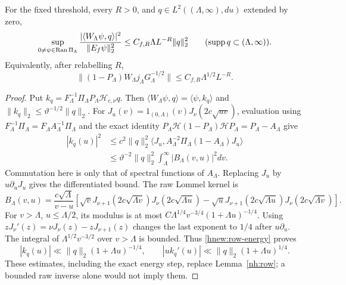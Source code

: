 \begin{proposition}
\label{hnew:natural-functional}
For the fixed threshold, every $R>0$, and
$q\in L^2((\Lambda,\infty),du)$ extended by zero,
\begin{equation}\label{hnew:exterior-functional}
 \sup_{0\ne\psi\in\operatorname{Ran}\Pi_\Lambda}
  \frac{|\langle W_\Lambda\psi,q\rangle|^2}{\|E_f\psi\|_2^2}
       \le C_{f,R}\Lambda L^{-R}\|q\|_2^2
       \qquad(\operatorname{supp} q\subset(\Lambda,\infty)).
\end{equation}
Equivalently, after relabelling $R$,
\[
 \|(1-P_\Lambda)W_\Lambda j_\Lambda G_\Lambda^{-1/2}\|
                       \le C_{f,R}\Lambda^{1/2}L^{-R}.
\]
\end{proposition}
\begin{proof}
Put $k_q=F_\Lambda^{-1}\Pi_\Lambda P_\Lambda\mathcal H_{c,\nu}q$.
Then $\langle W_\Lambda\psi,q\rangle=\langle\psi,k_q\rangle$ and
$\|k_q\|_2\le\vartheta^{-1/2}\|q\|_2$.
For $J_u(v)=1_{(0,\Lambda)}(v)J_\nu(2c\sqrt{uv})$, evaluation
using $F_\Lambda^{-1}\Pi_\Lambda=F_\Lambda A_\Lambda^{-1}\Pi_\Lambda$
and the exact identity
$P_\Lambda\mathcal H(1-P_\Lambda)\mathcal H P_\Lambda=P_\Lambda-A_\Lambda$
give
\begin{align}\label{hnew:row-energy}
 |k_q(u)|^2
 &\le c^2\|q\|_2^2
 \langle J_u,A_\Lambda^{-2}\Pi_\Lambda(1-A_\Lambda)J_u\rangle\\
 &\le\vartheta^{-2}\|q\|_2^2
                 \int_\Lambda^\infty|B_\Lambda(v,u)|^2dv.\nonumber
\end{align}
Commutation here is only that of spectral functions of $A_\Lambda$.
Replacing $J_u$ by $u\partial_uJ_u$ gives the differentiated bound.
The raw Lommel kernel is
\[
 B_\Lambda(v,u)=\frac{c\sqrt\Lambda}{v-u}
 \left[\sqrt v J_{\nu+1}(2c\sqrt{\Lambda v})J_\nu(2c\sqrt{\Lambda u})
 -\sqrt u J_{\nu+1}(2c\sqrt{\Lambda u})J_\nu(2c\sqrt{\Lambda v})\right].
\]
For $v>\Lambda$, $u\le\Lambda/2$, its modulus is at most
$C\Lambda^{1/4}v^{-3/4}(1+\Lambda u)^{-1/4}$.
Using $zJ_\nu'(z)=\nu J_\nu(z)-zJ_{\nu+1}(z)$ changes the last
exponent to $1/4$ after $u\partial_u$.
The integral of $\Lambda^{1/2}v^{-3/2}$ over $v>\Lambda$ is bounded.
Thus \eqref{hnew:row-energy} proves
\begin{equation}\label{hnew:row-bounds}
 |k_q(u)|\ll\|q\|_2(1+\Lambda u)^{-1/4},\qquad
 |u k_q'(u)|\ll\|q\|_2(1+\Lambda u)^{1/4}.
\end{equation}
These estimates, including the exact energy step, replace
Lemma~\ref{nh:row}; a bounded raw inverse alone would not imply them.


\end{proof}
